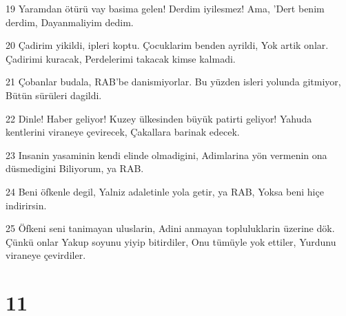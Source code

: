 \par 19 Yaramdan ötürü vay basima gelen! Derdim iyilesmez! Ama, 'Dert benim derdim, Dayanmaliyim dedim.
\par 20 Çadirim yikildi, ipleri koptu. Çocuklarim benden ayrildi, Yok artik onlar. Çadirimi kuracak, Perdelerimi takacak kimse kalmadi.
\par 21 Çobanlar budala, RAB'be danismiyorlar. Bu yüzden isleri yolunda gitmiyor, Bütün sürüleri dagildi.
\par 22 Dinle! Haber geliyor! Kuzey ülkesinden büyük patirti geliyor! Yahuda kentlerini viraneye çevirecek, Çakallara barinak edecek.
\par 23 Insanin yasaminin kendi elinde olmadigini, Adimlarina yön vermenin ona düsmedigini Biliyorum, ya RAB.
\par 24 Beni öfkenle degil, Yalniz adaletinle yola getir, ya RAB, Yoksa beni hiçe indirirsin.
\par 25 Öfkeni seni tanimayan uluslarin, Adini anmayan topluluklarin üzerine dök. Çünkü onlar Yakup soyunu yiyip bitirdiler, Onu tümüyle yok ettiler, Yurdunu viraneye çevirdiler.

\chapter{11}

